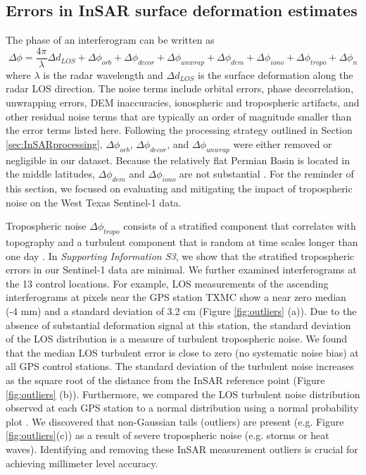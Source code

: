 \documentclass[draft]{agujournal2019}
\begin{document}
\subsection{Errors in InSAR surface deformation estimates}
\label{sec:errors} 
The phase of an interferogram can be written as \cite{Zebker1992, Zebker1994, Zebker1997}
\begin{equation}
	\Delta \phi = \frac{4 \pi}{\lambda} \Delta d_{LOS} +  \Delta \phi_{orb} + \Delta \phi_{decor} + \Delta \phi_{unwrap}  + \Delta \phi_{dem} + \Delta \phi_{iono} + \Delta \phi_{tropo}  + \Delta \phi_{n}
\end{equation}
where $ \lambda $ is the radar wavelength and $ \Delta d_{LOS} $ is the surface deformation along the radar LOS direction. The noise terms include orbital errors, phase decorrelation, unwrapping errors, DEM inaccuracies, ionospheric and tropospheric artifacts, and other residual noise terms that are typically an order of magnitude smaller than the error terms listed here. Following the processing strategy outlined in Section \ref{sec:InSARprocessing}, $\Delta \phi_{orb}$, $\Delta \phi_{decor}$, and $\Delta \phi_{unwrap}$ were either removed or negligible in our dataset. Because the relatively flat Permian Basin is located in the middle latitudes, $\Delta \phi_{dem}$ and $\Delta \phi_{iono}$ are not substantial \cite{Fattahi2013, Liang2019}. For the reminder of this section, we focused on evaluating and mitigating the impact of tropospheric noise on the West Texas Sentinel-1 data.

Tropospheric noise $\Delta \phi_{tropo}$ consists of a stratified component that correlates with topography \cite{Doin2009} and a turbulent component that is random at time scales longer than one day \cite{Emardson2003}. In \textit{Supporting Information S3}, we show that the stratified tropospheric errors in our Sentinel-1 data are minimal. We further examined interferograms at the 13 control locations. For example, LOS measurements of the ascending interferograms at pixels near the GPS station TXMC show a near zero median (-4 mm) and a standard deviation of 3.2 cm (Figure \ref{fig:outliers} (a)). Due to the absence of substantial deformation signal at this station, the standard deviation of the LOS distribution is a measure of turbulent tropospheric noise.  We found that the median LOS turbulent error is close to zero (no systematic noise bias) at all GPS control stations. The standard deviation of the turbulent noise increases as the square root of the distance from the InSAR reference point (Figure \ref{fig:outliers} (b)). Furthermore, we compared the LOS turbulent noise distribution observed at each GPS station to a normal distribution using a normal probability plot \cite{filliben1975probability}. We discovered that non-Gaussian tails (outliers) are present (e.g. Figure \ref{fig:outliers}(c)) as a result of severe tropospheric noise (e.g. storms or heat waves). Identifying and removing these InSAR measurement outliers is crucial for achieving millimeter level accuracy. 
\end{document}
